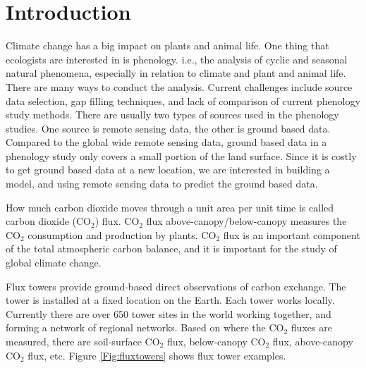 \documentclass{article}\usepackage[]{graphicx}\usepackage[]{color}
\begin{document}
\newpage

\section{Introduction}

Climate change has a big impact on plants and animal life. One thing that ecologists are interested in is phenology. i.e., the analysis of cyclic and seasonal natural phenomena, especially in relation to climate and plant and animal life. There are many ways to conduct the analysis. Current challenges include source data selection, gap filling techniques, and lack of comparison of current phenology study methods. There are usually two types of sources used in the phenology studies. One source is remote sensing data, the other is ground based data. Compared to the global wide remote sensing data, ground based data in a phenology study only covers a small portion of the land surface. Since it is costly to get ground based data at a new location, we are interested in building a model, and using remote sensing data to predict the ground based data.
 
How much carbon dioxide moves through a unit area per unit time is called carbon dioxide (CO$_2$) flux. 
CO$_2$ flux above-canopy/below-canopy measures the CO$_2$ consumption and production by plants.
CO$_2$ flux is an important component of the total atmospheric carbon balance, and it is important for the study of global climate change. 

Flux towers provide ground-based direct observations of carbon exchange. The tower is installed at a fixed location on the Earth.  Each tower works locally. Currently there are over 650 tower sites in the world working together, and forming a network of regional networks. 
Based on where the CO$_2$ fluxes are measured, there are soil-surface CO$_2$ flux, below-canopy CO$_2$ flux, above-canopy CO$_2$ flux, etc. Figure \ref{Fig:fluxtowers} shows flux tower examples.
\end{document}
